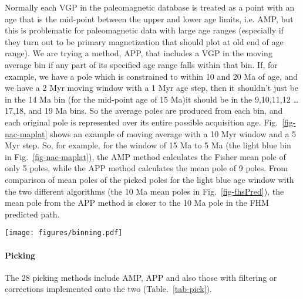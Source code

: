 Normally each VGP in the paleomagnetic database is treated as a point with an
age that is the mid-point between the upper and lower age limits, i.e. AMP, but
this is problematic for paleomagnetic data with large age ranges (especially if
they turn out to be primary magnetization that should plot at old end of age
range). We are trying a method, APP, that includes a VGP in the moving average
bin if any part of its specified age range falls within that bin. If, for
example, we have a pole which is constrained to within 10 and 20 Ma of age, and
we have a 2 Myr moving window with a 1 Myr age step, then it shouldn't just be
in the 14 Ma bin (for the mid-point age of 15 Ma)\textemdash{}it
should be in the 9,10,11,12
\ldots17,18, and 19 Ma bins. So the
average poles are produced from each bin, and each original pole is represented
over its entire possible acquisition age. Fig.~\ref{fig-nac-maplat} shows an
example of moving average with a 10 Myr window and a 5 Myr step. So, for
example, for the window of 15 Ma to 5 Ma (the light blue bin in
Fig.~\ref{fig-nac-maplat}), the AMP method calculates the Fisher mean pole of
only 5 poles, while the APP method calculates the mean pole of 9 poles. From
comparison of mean poles of the picked poles for the light blue age window with
the two different algorithms (the 10 Ma mean poles in Fig.~\ref{fig-fhsPred}),
the mean pole from the APP method is closer to the 10 Ma pole in the FHM
predicted path.

\begin{figure*}
\centering
\texttt{[image: figures/binning.pdf]}
\caption[Moving average (MA) methods]{An example of 10 Myr moving window and 5
Myr step in the moving average method, based on poles of the $NAC$. Every age
window has a different color. Red points are the midpoints of low and high
magnetic ages. The vertical axis has no specific meaning here.
}\label{fig-nac-maplat}
\end{figure*}

\paragraph{Picking}

The 28 picking methods include AMP, APP and also those with filtering or
corrections implemented onto the two (Table.~\ref{tab-pick}).

